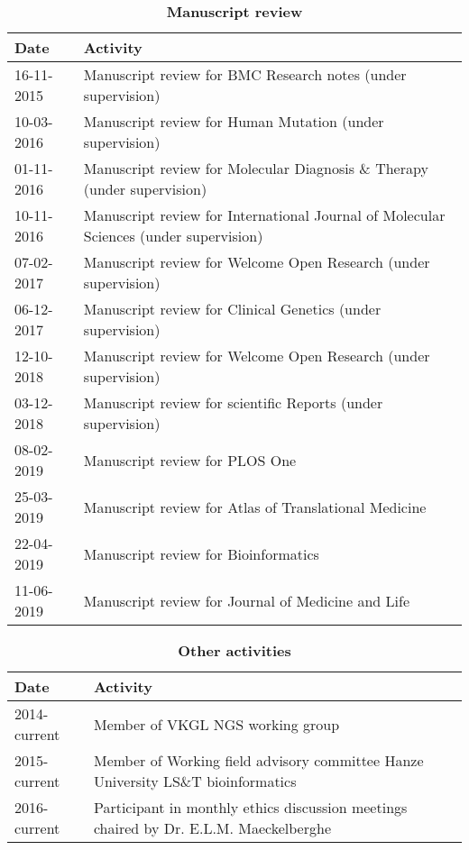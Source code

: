 \begin{appendices}
	\begin{table}
		\caption*{\textbf{Manuscript review}}
		\footnotesize
		\begin{tabulary}{\linewidth}{LL}
			Date & Activity \\
			\hline
			\rule{0pt}{2.5ex}\mbox{16-11-2015} & Manuscript review for BMC Research notes (under supervision)\\
			\rule{0pt}{2.5ex}\mbox{10-03-2016} & Manuscript review for Human Mutation (under supervision)\\
			\rule{0pt}{2.5ex}\mbox{01-11-2016} & Manuscript review for Molecular Diagnosis \& Therapy (under supervision)\\
			\rule{0pt}{2.5ex}\mbox{10-11-2016} & Manuscript review for International Journal of Molecular Sciences (under supervision)\\
			\rule{0pt}{2.5ex}\mbox{07-02-2017} & Manuscript review for Welcome Open Research (under supervision)\\
			\rule{0pt}{2.5ex}\mbox{06-12-2017} & Manuscript review for Clinical Genetics (under supervision)\\
			\rule{0pt}{2.5ex}\mbox{12-10-2018} & Manuscript review for Welcome Open Research (under supervision)\\
			\rule{0pt}{2.5ex}\mbox{03-12-2018} & Manuscript review for scientific Reports (under supervision)\\
			\rule{0pt}{2.5ex}\mbox{08-02-2019} & Manuscript review for PLOS One\\
			\rule{0pt}{2.5ex}\mbox{25-03-2019} & Manuscript review for Atlas of Translational Medicine\\
			\rule{0pt}{2.5ex}\mbox{22-04-2019} & Manuscript review for Bioinformatics \\
			\rule{0pt}{2.5ex}\mbox{11-06-2019} & Manuscript review for Journal of Medicine and Life\\
			\hline
		\end{tabulary}
		\label{table:appendix_activities_5}
		\end{table}
			
			
	\begin{table}
		\caption*{\textbf{Other activities}}
		\footnotesize
		\begin{tabulary}{\linewidth}{LL}
			Date & Activity \\
			\hline	
			\rule{0pt}{2.5ex}\mbox{2014-current} & Member of VKGL NGS working group \\
			\rule{0pt}{2.5ex}\mbox{2015-current} & Member of Working field advisory committee Hanze University LS\&T bioinformatics \\
			\rule{0pt}{2.5ex}\mbox{2016-current} & Participant in monthly ethics discussion meetings chaired by Dr. E.L.M. Maeckelberghe \\
			\hline
		\end{tabulary}
		\label{table:appendix_activities_6}
	\end{table}


\end{appendices}
